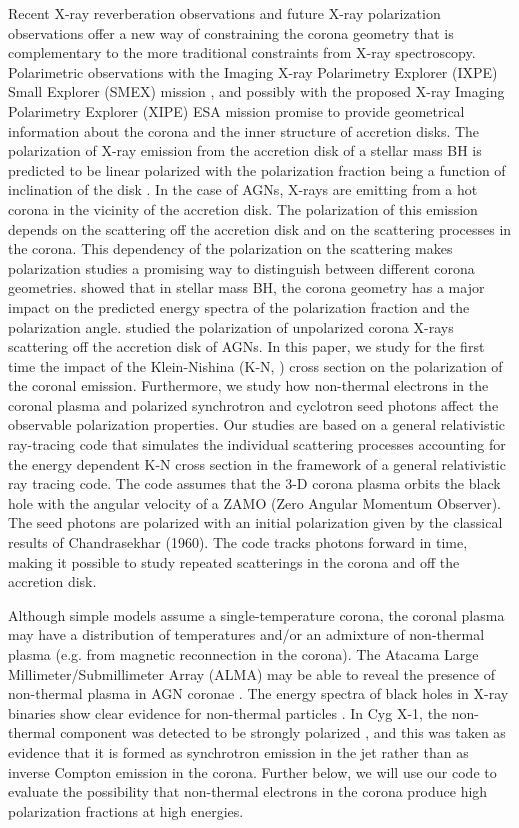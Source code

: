 \documentclass[manuscript]{aastex}
\begin{document}
Recent X-ray reverberation observations \citep[e.g.][]{fab09, wil13} and future X-ray polarization observations 
offer a new way of constraining the corona geometry  that is complementary to the more traditional constraints from X-ray spectroscopy. Polarimetric observations with the Imaging X-ray Polarimetry Explorer (IXPE) Small Explorer (SMEX) mission \citep{wei14}, and possibly with the proposed X-ray Imaging Polarimetry Explorer (XIPE) ESA mission \citep{sof13} promise to provide geometrical information about the corona and the inner structure of accretion disks. 
%
The polarization of X-ray emission from the accretion disk of a stellar mass BH is predicted to be linear polarized with the polarization fraction being a function of inclination of the disk \citep[and references there in]{li09}. In the case of AGNs, X-rays are emitting from a hot corona in the vicinity of the accretion disk. The polarization of this emission depends on the scattering off the accretion disk and on the scattering  processes in the corona. This dependency of the polarization on the scattering makes polarization studies a promising way to distinguish between different corona geometries. \citet{sch10} showed that in stellar mass BH, the corona geometry has a major impact on the predicted energy spectra of the polarization fraction and the polarization angle. \citet{dov12} studied the polarization of unpolarized corona X-rays scattering off the accretion disk of AGNs. In this paper, we study for the first time the impact of the Klein-Nishina (K-N, \citet{kle29}) cross section on the polarization of the coronal emission.  Furthermore, we study how non-thermal electrons in the coronal plasma and polarized synchrotron and cyclotron seed photons affect the observable polarization properties. Our studies are based on a general relativistic ray-tracing code that simulates the individual scattering processes accounting for the energy dependent K-N cross section in the framework of a general relativistic ray tracing code. The code assumes that the 3-D corona plasma orbits the black hole with the angular velocity of a ZAMO (Zero Angular Momentum Observer). The seed photons are polarized with an initial polarization given by the classical results of Chandrasekhar (1960). The code tracks photons forward in time, making it possible to study repeated scatterings in the corona and off the accretion disk. 

Although simple models assume a single-temperature corona, the coronal plasma may have a distribution of temperatures and/or an admixture of non-thermal plasma (e.g. from magnetic reconnection in the corona). The Atacama Large Millimeter/Submillimeter Array (ALMA) may be able to reveal the presence of non-thermal plasma in AGN coronae \citep{ino14}. The energy spectra of black holes in X-ray binaries show clear evidence for non-thermal particles  \citep[e.g.][]{cop90, pou98, gie99, rom14, mal16}. In Cyg X-1, the non-thermal component was detected to be strongly polarized \citep{jou12, lau11}, and this was taken as evidence that it is formed as synchrotron emission in the jet rather than as inverse Compton emission in the corona.  Further below, we will use our code to evaluate the possibility that non-thermal electrons in the corona produce high polarization fractions at high energies.
\end{document}
